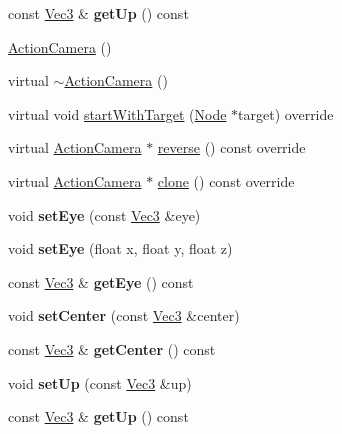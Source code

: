 \begin{DoxyCompactItemize}
\item 
\mbox{\label{classActionCamera_a9192e25f0e99309550f7bda7b7a2ca86}} 
const \hyperlink{classVec3}{Vec3} \& {\bfseries get\+Up} () const
\item 
\hyperlink{classActionCamera_aee348316c336c83dde4da52207727903}{Action\+Camera} ()
\item 
virtual \hyperlink{classActionCamera_a3db23be122cafb96ae503c086d47bafd}{$\sim$\+Action\+Camera} ()
\item 
virtual void \hyperlink{classActionCamera_a8f0cefd9df0f40a71d868e753a8cc3bc}{start\+With\+Target} (\hyperlink{classNode}{Node} $\ast$target) override
\item 
virtual \hyperlink{classActionCamera}{Action\+Camera} $\ast$ \hyperlink{classActionCamera_a3b5503c04db52eab56d69f5ef331e976}{reverse} () const override
\item 
virtual \hyperlink{classActionCamera}{Action\+Camera} $\ast$ \hyperlink{classActionCamera_a77342a783d5575d2efc6a9c8823c810d}{clone} () const override
\item 
\mbox{\label{classActionCamera_a19eb5d4bf00ccb0a13c7f5be78042fe6}} 
void {\bfseries set\+Eye} (const \hyperlink{classVec3}{Vec3} \&eye)
\item 
\mbox{\label{classActionCamera_a470c453238c67825603e2e1c01301e27}} 
void {\bfseries set\+Eye} (float x, float y, float z)
\item 
\mbox{\label{classActionCamera_a66c00d7a06d8f0d0e86dd4712a584ed5}} 
const \hyperlink{classVec3}{Vec3} \& {\bfseries get\+Eye} () const
\item 
\mbox{\label{classActionCamera_aecba6dd33e345dcb67597dc530b6ec5e}} 
void {\bfseries set\+Center} (const \hyperlink{classVec3}{Vec3} \&center)
\item 
\mbox{\label{classActionCamera_aa77878c823b046664f4203adb4a4b334}} 
const \hyperlink{classVec3}{Vec3} \& {\bfseries get\+Center} () const
\item 
\mbox{\label{classActionCamera_a4d77a6770dd0a7388023d8080bdd89aa}} 
void {\bfseries set\+Up} (const \hyperlink{classVec3}{Vec3} \&up)
\item 
\mbox{\label{classActionCamera_a9192e25f0e99309550f7bda7b7a2ca86}} 
const \hyperlink{classVec3}{Vec3} \& {\bfseries get\+Up} () const
\end{DoxyCompactItemize}
